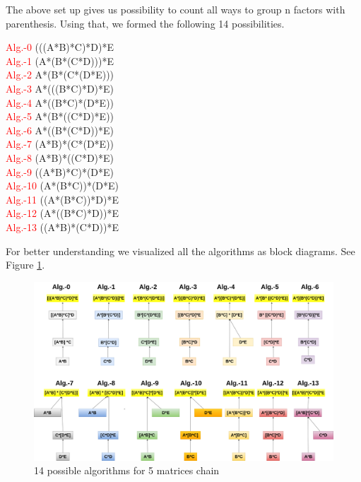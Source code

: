 \documentclass[10pts]{article}
\begin{document}
	
The above set up gives us possibility to count all ways to group n factors with parenthesis. Using that, we formed the following 14 possibilities.
\begin{center}
	\textcolor{red}{Alg.-0} (((A*B)*C)*D)*E \\ 
	\textcolor{red}{Alg.-1} (A*(B*(C*D)))*E\\
	\textcolor{red}{Alg.-2} A*(B*(C*(D*E)))\\
	\textcolor{red}{Alg.-3} A*(((B*C)*D)*E)\\
	\textcolor{red}{Alg.-4} A*((B*C)*(D*E))\\
	\textcolor{red}{Alg.-5} A*(B*((C*D)*E))\\
    \textcolor{red}{Alg.-6} A*((B*(C*D))*E) \\
	\textcolor{red}{Alg.-7} (A*B)*(C*(D*E))\\
	\textcolor{red}{Alg.-8} (A*B)*((C*D)*E) \\
	\textcolor{red}{Alg.-9} ((A*B)*C)*(D*E)\\
	\textcolor{red}{Alg.-10} (A*(B*C))*(D*E)\\
	\textcolor{red}{Alg.-11} ((A*(B*C))*D)*E\\
	\textcolor{red}{Alg.-12} (A*((B*C)*D))*E\\
	\textcolor{red}{Alg.-13} ((A*B)*(C*D))*E\\
\end{center}

For better understanding we visualized all the algorithms as block diagrams. See Figure \ref{fig:5mat_color_black_Arrow}.

\begin{figure}[h!] 
	\begin{center}
	\includegraphics[scale =0.25]{5mat_color_black_Arrow.png}
   	\caption{14 possible algorithms for 5 matrices chain}
   	\label{fig:5mat_color_black_Arrow}
   	\end{center}
\end{figure}
	
\end{document}
